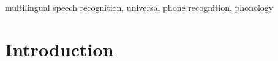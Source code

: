 \documentclass{article}
\newcommand{\gn}[1]{\textcolor{magenta}{\small [#1 --GN]}}
\newcommand{\drm}[1]{\textcolor{orange}{\small [#1 ---DRM]}}
\begin{document}
\begin{abstract}



\end{abstract}
%
\begin{keywords}
multilingual speech recognition, universal phone recognition, phonology
\end{keywords}
%
\section{Introduction}
\label{sec:intro}




\end{document}
